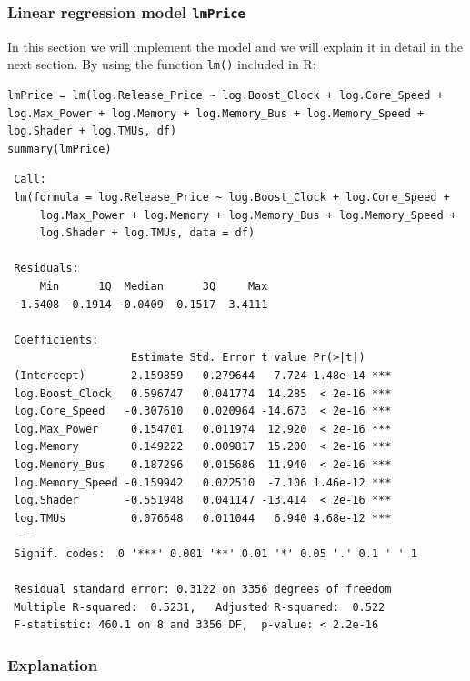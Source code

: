 \documentclass[a4paper]{article}
\begin{document}
\subsubsection{Linear regression model \texttt{lmPrice}}
In this section we will implement the model and we will explain it in detail in the next section. By using the function \verb|lm()| included in R:
\begin{mdframed}[leftline=false,rightline=false,backgroundcolor=lightblue!10,nobreak=false]
    \begin{verbatim}
lmPrice = lm(log.Release_Price ~ log.Boost_Clock + log.Core_Speed + log.Max_Power + log.Memory + log.Memory_Bus + log.Memory_Speed + log.Shader + log.TMUs, df)
summary(lmPrice)
    \end{verbatim}
\end{mdframed}
\begin{lstlisting}
 Call:
 lm(formula = log.Release_Price ~ log.Boost_Clock + log.Core_Speed + 
     log.Max_Power + log.Memory + log.Memory_Bus + log.Memory_Speed + 
     log.Shader + log.TMUs, data = df)

 Residuals:
     Min      1Q  Median      3Q     Max 
 -1.5408 -0.1914 -0.0409  0.1517  3.4111

 Coefficients:
                   Estimate Std. Error t value Pr(>|t|)    
 (Intercept)       2.159859   0.279644   7.724 1.48e-14 ***
 log.Boost_Clock   0.596747   0.041774  14.285  < 2e-16 ***
 log.Core_Speed   -0.307610   0.020964 -14.673  < 2e-16 ***
 log.Max_Power     0.154701   0.011974  12.920  < 2e-16 ***
 log.Memory        0.149222   0.009817  15.200  < 2e-16 ***
 log.Memory_Bus    0.187296   0.015686  11.940  < 2e-16 ***
 log.Memory_Speed -0.159942   0.022510  -7.106 1.46e-12 ***
 log.Shader       -0.551948   0.041147 -13.414  < 2e-16 ***
 log.TMUs          0.076648   0.011044   6.940 4.68e-12 ***
 ---
 Signif. codes:  0 '***' 0.001 '**' 0.01 '*' 0.05 '.' 0.1 ' ' 1

 Residual standard error: 0.3122 on 3356 degrees of freedom
 Multiple R-squared:  0.5231,	Adjusted R-squared:  0.522 
 F-statistic: 460.1 on 8 and 3356 DF,  p-value: < 2.2e-16

\end{lstlisting}

\subsubsection{Explanation}
\end{document}
